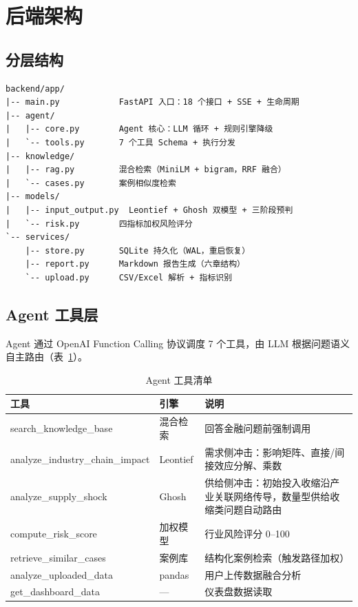 \documentclass[12pt, a4paper]{ctexart}
\begin{document}
\section{后端架构}

\subsection{分层结构}

\begin{lstlisting}
backend/app/
|-- main.py            FastAPI 入口：18 个接口 + SSE + 生命周期
|-- agent/
|   |-- core.py        Agent 核心：LLM 循环 + 规则引擎降级
|   `-- tools.py       7 个工具 Schema + 执行分发
|-- knowledge/
|   |-- rag.py         混合检索（MiniLM + bigram，RRF 融合）
|   `-- cases.py       案例相似度检索
|-- models/
|   |-- input_output.py  Leontief + Ghosh 双模型 + 三阶段预判
|   `-- risk.py        四指标加权风险评分
`-- services/
    |-- store.py       SQLite 持久化（WAL，重启恢复）
    |-- report.py      Markdown 报告生成（六章结构）
    `-- upload.py      CSV/Excel 解析 + 指标识别
\end{lstlisting}

\subsection{Agent 工具层}

Agent 通过 OpenAI Function Calling 协议调度 7 个工具，由 LLM 根据问题语义自主路由（表~\ref{tab:tools}）。

\begin{table}[htbp]
\centering
\caption{Agent 工具清单}
\label{tab:tools}
\begin{tabular}{@{}llp{6.8cm}@{}}
\toprule
工具 & 引擎 & 说明 \\
\midrule
search\_knowledge\_base & 混合检索 & 回答金融问题前强制调用 \\
analyze\_industry\_chain\_impact & Leontief & 需求侧冲击：影响矩阵、直接/间接效应分解、乘数 \\
analyze\_supply\_shock & Ghosh & 供给侧冲击：初始投入收缩沿产业关联网络传导，数量型供给收缩类问题自动路由 \\
compute\_risk\_score & 加权模型 & 行业风险评分 0--100 \\
retrieve\_similar\_cases & 案例库 & 结构化案例检索（触发路径加权） \\
analyze\_uploaded\_data & pandas & 用户上传数据融合分析 \\
get\_dashboard\_data & --- & 仪表盘数据读取 \\
\bottomrule
\end{tabular}
\end{table}
\end{document}

